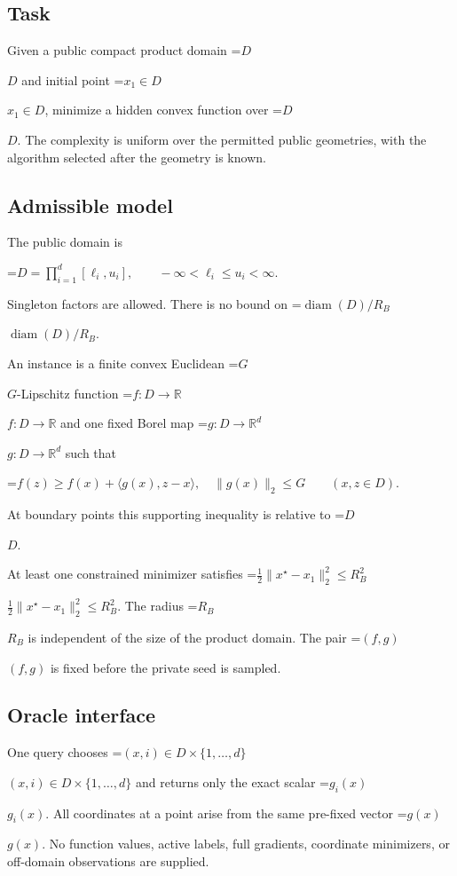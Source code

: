 \documentclass[10pt,a4paper]{article}
\newcommand{\AtlasMath}[1]{\par\begingroup\centering\setbox0=\hbox{$\displaystyle #1$}\ifdim\wd0>1.4\linewidth\typeout{ATLAS WIDE FORMULA: \the\wd0}\fi\ifdim\wd0>\linewidth\resizebox{\linewidth}{!}{\box0}\else\box0\fi\par\endgroup}
\newcommand{\AtlasInlineMath}[1]{\begingroup\setbox0=\hbox{$#1$}\ifdim\wd0>.4\linewidth\endgroup\AtlasMath{#1}\else\endgroup$#1$\fi}
\begin{document}
\subsection{Task}


Given a public compact product domain \AtlasInlineMath{D} and initial point \AtlasInlineMath{x_1\in D}, minimize a hidden convex function over \AtlasInlineMath{D}. The complexity is uniform over the permitted public geometries, with the algorithm selected after the geometry is known.



\subsection{Admissible model}


The public domain is
\AtlasMath{D=\prod_{i=1}^d[\ell_i,u_i],\qquad-\infty<\ell_i\le u_i<\infty.}
 Singleton factors are allowed. There is no bound on \AtlasInlineMath{\operatorname{diam}(D)/R_B}.



An instance is a finite convex Euclidean \AtlasInlineMath{G}-Lipschitz function \AtlasInlineMath{f:D\to\mathbb R} and one fixed Borel map \AtlasInlineMath{g:D\to\mathbb R^d} such that
\AtlasMath{f(z)\ge f(x)+\langle g(x),z-x\rangle,\quad\|g(x)\|_2\le G\qquad(x,z\in D).}
 At boundary points this supporting inequality is relative to \AtlasInlineMath{D}.



At least one constrained minimizer satisfies \AtlasInlineMath{\frac12\|x^\star-x_1\|_2^2\le R_B^2}. The radius \AtlasInlineMath{R_B} is independent of the size of the product domain. The pair \AtlasInlineMath{(f,g)} is fixed before the private seed is sampled.



\subsection{Oracle interface}


One query chooses \AtlasInlineMath{(x,i)\in D\times\{1,\ldots,d\}} and returns only the exact scalar \AtlasInlineMath{g_i(x)}. All coordinates at a point arise from the same pre-fixed vector \AtlasInlineMath{g(x)}. No function values, active labels, full gradients, coordinate minimizers, or off-domain observations are supplied.
\end{document}
